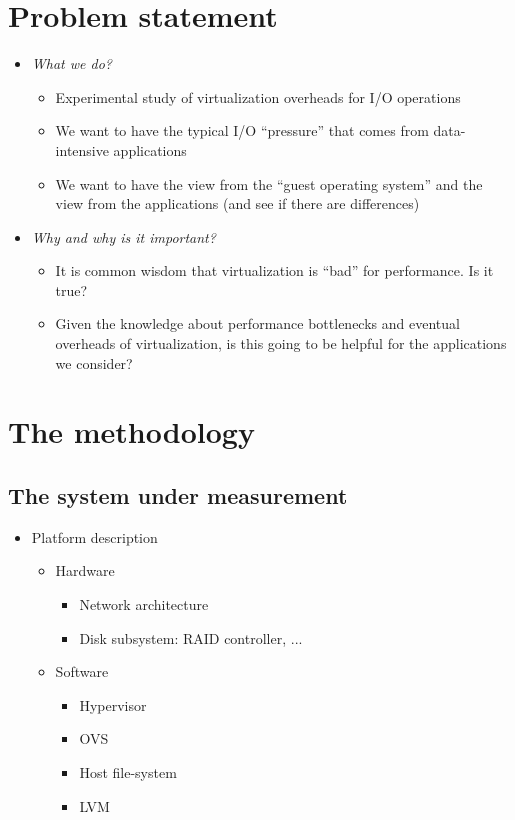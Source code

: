 \documentclass{acmsig}
\begin{document}
\section{Problem statement}
\begin{itemize}
  \item \textit{What we do?}
  \begin{itemize}
    \item Experimental study of virtualization overheads for I/O operations
    \item We want to have the typical I/O ``pressure'' that comes from data-intensive applications
    \item We want to have the view from the ``guest operating system'' and the view from the applications (and see if there are differences)
  \end{itemize}
  \item \textit{Why and why is it important?}
  \begin{itemize}
    \item It is common wisdom that virtualization is ``bad'' for performance. Is it true?
    \item Given the knowledge about performance bottlenecks and eventual overheads of virtualization, is this going to be helpful for the applications we consider?
  \end{itemize}
\end{itemize}

\section{The methodology}

\subsection{The system under measurement}
\begin{itemize}
  \item Platform description
  \begin{itemize}
    \item Hardware
    \begin{itemize}
      \item Network architecture
      \item Disk subsystem: RAID controller, ...
    \end{itemize}
    \item Software
    \begin{itemize}
      \item Hypervisor
      \item OVS
      \item Host file-system
      \item LVM
    \end{itemize}
  \end{itemize}
\end{itemize}
\end{document}
